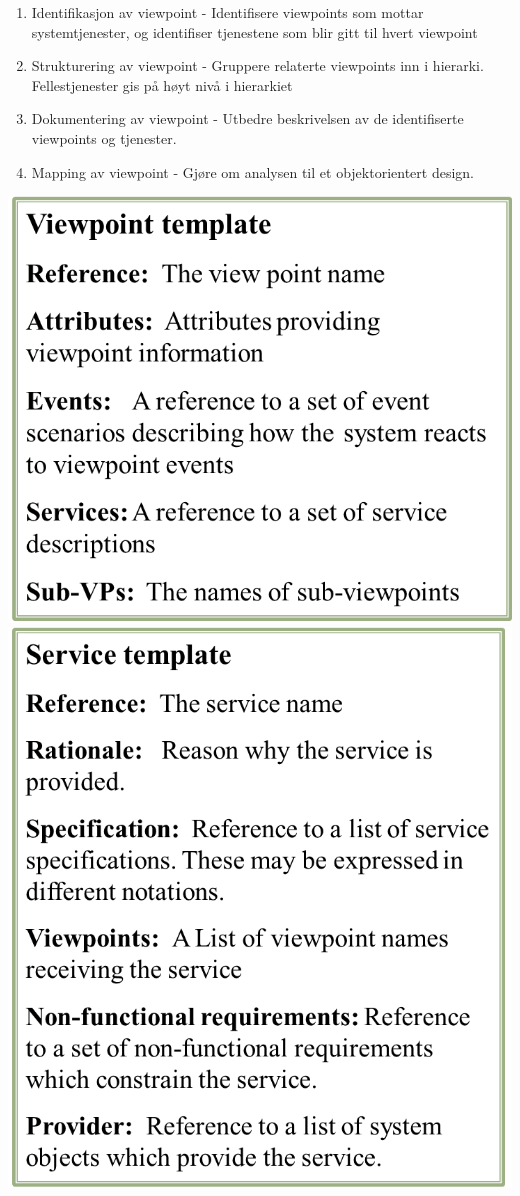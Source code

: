 \begin{enumerate}[1.]
\item
  Identifikasjon av viewpoint - Identifisere viewpoints som mottar
  systemtjenester, og identifiser tjenestene som blir gitt til hvert
  viewpoint
\item
  Strukturering av viewpoint - Gruppere relaterte viewpoints inn i
  hierarki. Fellestjenester gis på høyt nivå i hierarkiet
\item
  Dokumentering av viewpoint - Utbedre beskrivelsen av de identifiserte
  viewpoints og tjenester.
\item
  Mapping av viewpoint - Gjøre om analysen til et objektorientert
  design.
\end{enumerate}
\includegraphics{Forelesning 08/img/2.png}\includegraphics{Forelesning 08/img/3.png}

